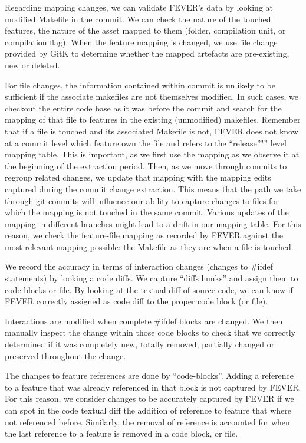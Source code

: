 Regarding mapping changes, we can validate FEVER's data by looking at modified Makefile in the commit.
We can check the nature of the touched features, the nature of the asset mapped to them (folder, compilation unit, or compilation flag).
When the feature mapping is changed, we use file change provided by GitK to determine whether the mapped artefacts are pre-existing, new or deleted.

For file changes, the information contained within commit is unlikely to be sufficient if the associate makefiles are not themselves modified.
In such cases, we checkout the entire code base as it was before the commit and search for the mapping of that file to features in the existing (unmodified) makefiles.
Remember that if a file is touched and its associated Makefile is not, FEVER does not know at a commit level which feature own the file and refers to the ``release''"'' level mapping table.
This is important, as we first use the mapping as we observe it at the beginning of the extraction period.
Then, as we move through commits to regroup related changes, we update that mapping with the mapping edits captured during the commit change extraction.
This means that the path we take through git commits will influence our ability to capture changes to files for which the mapping is not touched in the same commit.
Various updates of the mapping in different branches might lead to a drift in our mapping table.
For this reason, we check the feature-file mapping as recorded by FEVER against the most relevant mapping possible: the Makefile as they are when a file is touched.

We record the accuracy in terms of interaction changes (changes to \#ifdef statements) by looking a code diffs.
We capture ``diffs hunks'' and assign them to code blocks or file. By looking at the textual diff of source code, we can 
know if FEVER correctly assigned as code diff to the proper code block (or file).

Interactions are modified when complete \#ifdef blocks are changed. We then manually inspect 
the change within those code blocks to check that we correctly determined if it was completely new, totally removed, partially changed or preserved throughout the change.

The changes to feature references are done by ``code-blocks''. Adding a reference to a feature that was already referenced in that block is not captured by FEVER. 
For this reason, we consider changes to be accurately captured by FEVER if we can spot in the code textual diff the addition of reference to feature that where not referenced before.
Similarly, the removal of reference is accounted for when the last reference to a feature is removed in a code block, or file.

